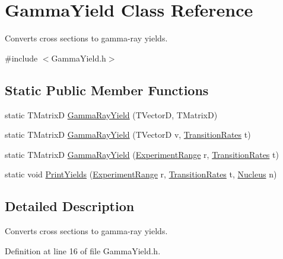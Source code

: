 \hypertarget{classGammaYield}{\section{Gamma\-Yield Class Reference}
\label{classGammaYield}
}


Converts cross sections to gamma-\/ray yields.  




{\ttfamily \#include $<$Gamma\-Yield.\-h$>$}

\subsection*{Static Public Member Functions}
\begin{DoxyCompactItemize}
\item 
static T\-Matrix\-D \hyperlink{classGammaYield_ae2eae4ee7762789e0a70765e09b8383e}{Gamma\-Ray\-Yield} (T\-Vector\-D, T\-Matrix\-D)
\item 
static T\-Matrix\-D \hyperlink{classGammaYield_adbeac7ddd28892dcc254452e6365e851}{Gamma\-Ray\-Yield} (T\-Vector\-D v, \hyperlink{classTransitionRates}{Transition\-Rates} t)
\item 
static T\-Matrix\-D \hyperlink{classGammaYield_a1345958656129277ed4371937903b363}{Gamma\-Ray\-Yield} (\hyperlink{classExperimentRange}{Experiment\-Range} r, \hyperlink{classTransitionRates}{Transition\-Rates} t)
\item 
static void \hyperlink{classGammaYield_adc91c5581c8f77170515083002d8422f}{Print\-Yields} (\hyperlink{classExperimentRange}{Experiment\-Range} r, \hyperlink{classTransitionRates}{Transition\-Rates} t, \hyperlink{classNucleus}{Nucleus} n)
\end{DoxyCompactItemize}


\subsection{Detailed Description}
Converts cross sections to gamma-\/ray yields. 

Definition at line 16 of file Gamma\-Yield.\-h.



